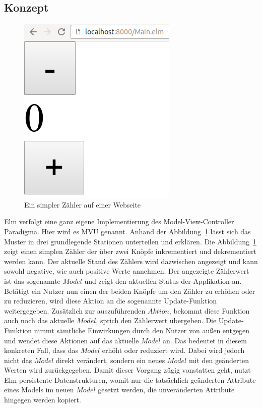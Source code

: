 \subsection{Konzept}
\label{sec:Konzept}
\begin{figure}[h]
	\centering  
	\includegraphics[scale=0.5]{img/counter.png}
	\caption{Ein simpler Zähler auf einer Webseite}\label{fig:counter}
\end{figure}
\noindent Elm verfolgt eine ganz eigene Implementierung des Model-View-Controller Paradigma. Hier wird es \ac{MVU} genannt. Anhand der Abbildung~\ref{fig:counter} lässt sich das Muster in drei grundlegende Stationen unterteilen und erklären.
Die Abbildung~\ref{fig:counter} zeigt einen simplen Zähler der über zwei Knöpfe inkrementiert und dekrementiert werden kann. Der aktuelle Stand des Zählers wird dazwischen angezeigt und kann sowohl negative, wie auch positive Werte annehmen.
Der angezeigte Zählerwert ist das sogenannte $Model$ und zeigt den aktuellen Status der Applikation an. Betätigt ein Nutzer nun einen der beiden Knöpfe um den Zähler zu erhöhen oder zu reduzieren, wird diese Aktion an die sogenannte Update-Funktion weitergegeben. Zusätzlich zur auszuführenden $Aktion$, bekommt diese Funktion auch noch das aktuelle $Model$, sprich den Zählerwert übergeben.
Die Update-Funktion nimmt sämtliche Einwirkungen durch den Nutzer von außen entgegen und wendet diese Aktionen auf das aktuelle $Model$ an. Das bedeutet in diesem konkreten Fall, dass das $Model$ erhöht oder reduziert wird. Dabei wird jedoch nicht das $Model$ direkt verändert, sondern ein neues $Model$ mit den geänderten Werten wird zurückgegeben. Damit dieser Vorgang zügig vonstatten geht, nutzt Elm persistente Datenstrukturen, womit nur die tatsächlich geänderten Attribute eines Models im neuen $Model$ gesetzt werden, die unveränderten Attribute hingegen werden kopiert.

